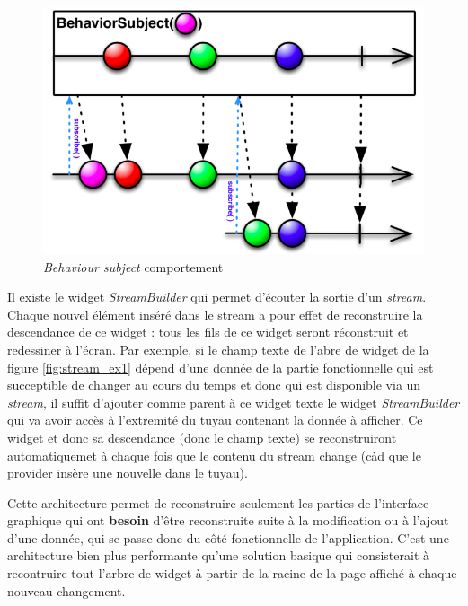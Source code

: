 \begin{figure}[H]
  \includegraphics[width=.7\linewidth]{content/imgs/stream.png}
  \caption{\textit{Behaviour subject} comportement}
  \label{fig:stream}
\end{figure}

Il existe le widget \textit{StreamBuilder} qui permet d'écouter la sortie d'un \textit{stream}. Chaque nouvel élément inséré dans le stream a pour effet de reconstruire la descendance de ce widget : tous les fils de ce widget seront réconstruit et redessiner à l'écran. Par exemple, si le champ texte de l'abre de widget de la figure \ref{fig:stream_ex1} dépend d'une donnée de la partie fonctionnelle qui est succeptible de changer au cours du temps et donc qui est disponible via un \textit{stream}, il suffit d'ajouter comme parent à ce widget texte le widget \textit{StreamBuilder} qui va avoir accès à l'extremité du tuyau contenant la donnée à afficher. Ce widget et donc sa descendance (donc le champ texte) se reconstruiront automatiquemet à chaque fois que le contenu du stream change (càd que le provider insère une nouvelle dans le tuyau).

Cette architecture permet de reconstruire seulement les parties de l'interface graphique qui ont \textbf{besoin} d'être reconstruite suite à la modification ou à l'ajout d'une donnée, qui se passe donc du côté fonctionnelle de l'application. C'est une architecture bien plus performante qu'une solution basique qui consisterait à recontruire tout l'arbre de widget à partir de la racine de la page affiché à chaque nouveau changement.


